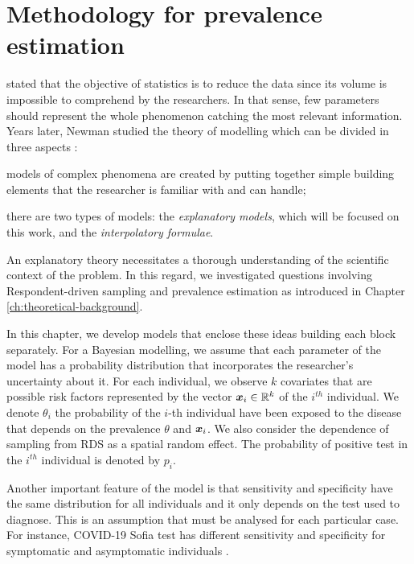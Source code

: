 \chapter{Methodology for prevalence estimation}

\textcite[p. 311]{fisher1922mathematical} stated that the objective of
statistics is to reduce the data since its volume is impossible
to comprehend by the researchers. In that sense, few parameters should represent the whole phenomenon catching the most relevant information.
Years later, Newman studied the theory of modelling which can be divided
in three aspects \cite[p. 161]{lehmann2012model}:

\begin{alineas}
  \item models of complex phenomena are created by putting together
  simple building elements that the researcher is familiar with and can
  handle;
  \item there are two types of models: the \textit{explanatory models},
  which will be focused on this work, and the \textit{interpolatory formulae}.
  \item An explanatory theory necessitates a thorough understanding of the scientific context of the problem. In this regard, we investigated questions involving Respondent-driven sampling and prevalence estimation as introduced in Chapter \ref{ch:theoretical-background}.
\end{alineas}

In this chapter, we develop models that enclose these ideas building each
block separately. For a Bayesian modelling, we assume that each parameter
of the model has a probability distribution that incorporates the
researcher's uncertainty about it. For each individual, we observe $k$
covariates that are possible risk factors represented by the vector
$\boldsymbol{x}_i \in \mathbb{R}^{k}$ of the $i^{th}$ individual. We denote $\theta_i$ the
probability of the $i$-th individual have been exposed to the disease
that depends on the prevalence $\theta$ and $\boldsymbol{x}_i$. We also consider the
dependence of sampling from RDS as a spatial random effect. The probability of
positive test in the $i^{th}$ individual is denoted by $p_i$.

Another important feature of the model is that sensitivity and
specificity have the same distribution for all individuals and
it only depends on the test used to diagnose. This is an assumption
that must be analysed for each particular case. For instance, COVID-19
Sofia test has different sensitivity and specificity for symptomatic and
asymptomatic individuals \cite[Table 1][p. 3]{mitchell2021performance}.

